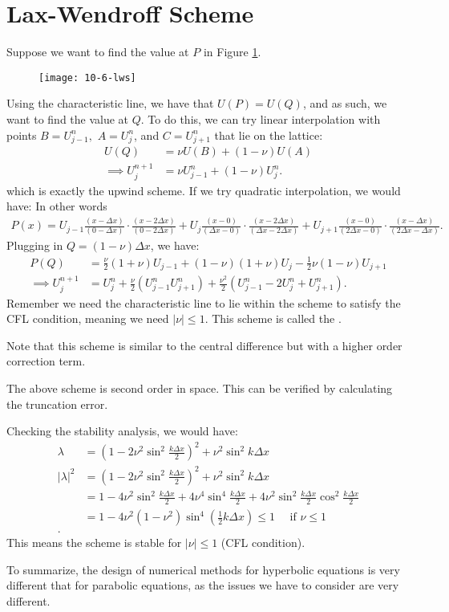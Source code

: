 \documentclass[../main/main.tex]{subfiles}
\begin{document}
\section{Lax-Wendroff Scheme}
Suppose we want to find the value at $P$ in Figure \ref{10-6-lws}.
\begin{figure}[htpb]
    \centering
    \texttt{[image: 10-6-lws]}
    \caption{}
    \label{10-6-lws}
\end{figure}
Using the characteristic line, we have that $U(P) = U(Q)$, and as such, we want to find the value at $Q$. To do this, we can try linear interpolation with points $B = U^n_{j-1}, $ $A=U^n_j$, and $C=U_{j+1}^n$ that lie on the lattice:
\begin{align*}
    U(Q) &= \nu U(B) + (1-\nu)U(A) \\
    \implies U_j^{n+1} &= \nu U_{j-1}^n + (1-\nu)U^n_j
.\end{align*} which is exactly the upwind scheme. If we try quadratic interpolation, we would have:
In other words 
\begin{align*} 
    P(x) = U_{j-1} \frac{(x-\Delta x)}{(0 - \Delta x)}\cdot \frac{(x-2\Delta x)}{(0-2\Delta x)} + U_j \frac{(x-0)}{(\Delta x - 0)}\cdot  \frac{(x-2\Delta x)}{(\Delta x - 2 \Delta x)} + U_{j+1} \frac{(x-0)}{(2\Delta x-0)} \cdot  \frac{(x-\Delta x)}{(2\Delta x - \Delta x)}
.\end{align*} Plugging in $Q = (1-\nu) \Delta x$, we have:
\begin{align*}
    P(Q) &= \frac{\nu}{2}(1+\nu) U_{j-1} + (1-\nu)(1+\nu) U_j - \frac{1}{2}\nu(1-\nu) U_{j+1}\\
    \implies U^{n+1}_j &= U^n_j + \frac{\nu}{2}(U^n_{j-1}U^n_{j+1})+\frac{\nu^2}{2}\left( U_{j-1}^n - 2U^n_j + U_{j+1}^n \right) 
.\end{align*}
Remember we need the characteristic line to lie within the scheme to satisfy the CFL condition, meaning we need  $|\nu| \le  1$. This scheme is called the .
\begin{remark}
   Note that this scheme is similar to the central difference but with a higher order correction term. 
\end{remark}
\begin{remark}
    The above scheme is second order in space. This can be verified by calculating the truncation error.
\end{remark}
Checking the stability analysis, we would have: 
\begin{align*}
    \lambda &= (1-2\nu^2\sin^2 \frac{k\Delta x}{2})^2 + \nu^2 \sin^2 k \Delta x \\
    |\lambda|^2&= (1-2\nu^2 \sin^2 \frac{k\Delta x}{2})^2 + \nu^2 \sin^2 k\Delta x \\
    &= 1-4\nu^2 \sin^2 \frac{k\Delta x}{2}+ 4 \nu^4 \sin^4 \frac{k\Delta x}{2}+4\nu^2 \sin^2 \frac{k\Delta x}{2} \cos^2 \frac{k\Delta x}{2} \\
    &= 1-4\nu^2(1-\nu^2)\sin^{4}\left(\frac{1}{2} k\Delta x\right) \le  1\quad \text{ if }\nu \le  1 \\
.\end{align*} This means the scheme is stable for $|\nu|\le  1$ (CFL condition). 

To summarize, the design of numerical methods for hyperbolic equations is very different that for parabolic equations, as the issues we have to consider are very different.
\end{document}
